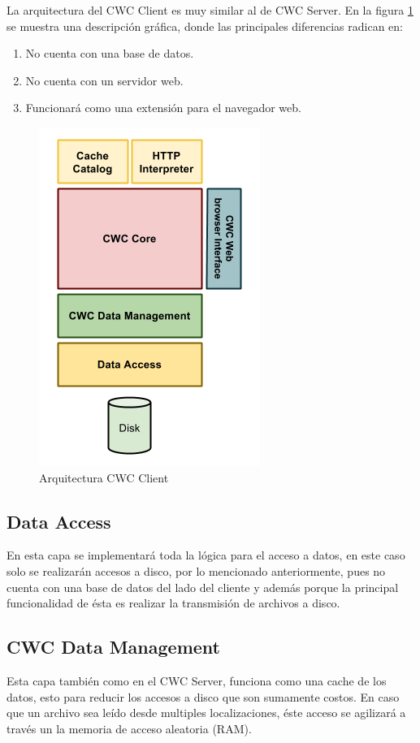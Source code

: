 La arquitectura del CWC Client es muy similar al de CWC Server. En la figura \ref{ArquitecturaCWCClient} se muestra una descripción gráfica, donde las principales diferencias radican en:

\begin{enumerate}
\item No cuenta con una base de datos.
\item No cuenta con un servidor web. 
\item Funcionará como una extensión para el navegador web. 
\end{enumerate}

\begin{figure}
  \centering
    \includegraphics[scale=0.75]{gfx/ArquitecturaCWCClient}
  \caption{Arquitectura CWC Client}
  \label{ArquitecturaCWCClient}
\end{figure}

\subsection{Data Access}
En esta capa se implementará toda la lógica para el acceso a datos, en este caso solo se realizarán accesos a disco, por lo mencionado anteriormente, pues no cuenta con una base de datos del lado del cliente y además porque la principal funcionalidad de ésta es realizar la transmisión de archivos a disco. 

\subsection{CWC Data Management}
Esta capa también como en el CWC Server, funciona como una cache de los datos, esto para reducir los accesos a disco que son sumamente costos.
En caso que un archivo sea leído desde multiples localizaciones, éste acceso se agilizará a través un la memoria de acceso aleatoria (RAM).

